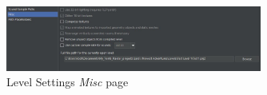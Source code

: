  \begin{figure}
    \centering
     \includegraphics[width=0.75\textwidth]{screenshots/24.jpg}
     \caption{Level Settings \emph{Misc} page}
     \label{fig:TElevelsettingsMisc}
\end{figure}



